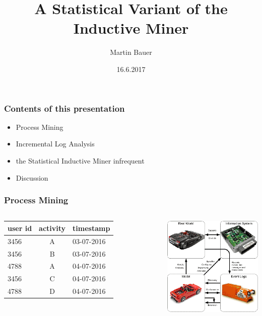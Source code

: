 \documentclass{beamer}
\title[A Statistical Variant of the Inductive Miner]{A Statistical Variant of the Inductive Miner}
\author[Kurzname]{Martin Bauer}
\institute{Institut für Informatik\\Humboldt-Universität zu Berlin}
\date{16.6.2017}
\begin{document}
\titlepage
\begin{frame}
\centering
\frametitle{Contents of this presentation}
\begin{itemize}
\item Process Mining
\item Incremental Log Analysis
\item the Statistical Inductive Miner infrequent
\item Discussion
\end{itemize}
\end{frame}

\begin{frame}
\frametitle{Process Mining}
\begin{columns}
\centering
\begin{tabular}{l|c|l}
 user id & activity & timestamp\\
 \hline
 3456 & A & 03-07-2016\\
 3456 & B & 03-07-2016\\
 4788 & A & 04-07-2016\\
 3456 & C & 04-07-2016\\
 4788 & D & 04-07-2016\\
 \end{tabular}
 \includegraphics[width=0.9\linewidth]{processmining.png}
\end{columns}
\end{frame}
\end{document}
